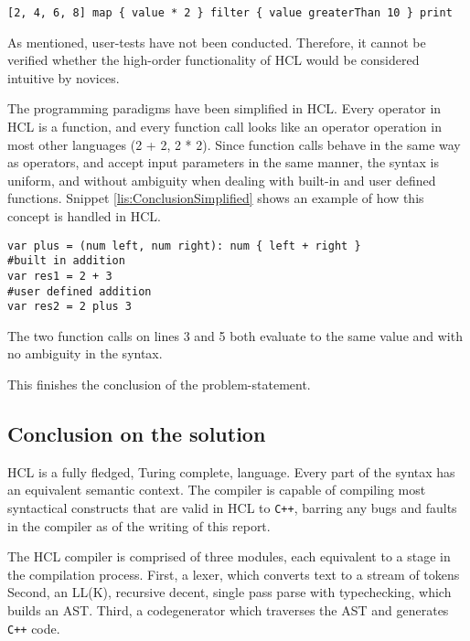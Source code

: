 \begin{lstlisting}[language=hcl,label=lis:ConclusionMapFilter,caption=High-order functionality in HCL]
[2, 4, 6, 8] map { value * 2 } filter { value greaterThan 10 } print
\end{lstlisting}

As mentioned, user-tests have not been conducted.
Therefore, it cannot be verified whether the high-order functionality of HCL would be considered intuitive by novices.

The programming paradigms have been simplified in HCL.
Every operator in HCL is a function, and every function call looks like an operator operation in most other languages (2 + 2, 2 * 2).
Since function calls behave in the same way as operators, and accept input parameters in the same manner, the syntax is uniform, and without ambiguity when dealing with built-in and user defined functions.
Snippet \ref{lis:ConclusionSimplified} shows an example of how this concept is handled in HCL.

\begin{lstlisting}[language=hcl,label=lis:ConclusionSimplified,caption=Built-in and user defined function]
var plus = (num left, num right): num { left + right }
#built in addition
var res1 = 2 + 3
#user defined addition
var res2 = 2 plus 3 
\end{lstlisting}

The two function calls on lines 3 and 5 both evaluate to the same value and with no ambiguity in the syntax.

This finishes the conclusion of the problem-statement.

\subsection{Conclusion on the solution} %
HCL is a fully fledged, Turing complete, language.
Every part of the syntax has an equivalent semantic context. 
The compiler is capable of compiling most syntactical constructs that are valid in HCL to \texttt{C++}, barring any bugs and faults in the compiler as of the writing of this report.

The HCL compiler is comprised of three modules, each equivalent to a stage in the compilation process.
First, a lexer, which converts text to a stream of tokens
Second, an LL(K), recursive decent, single pass parse with typechecking, which builds an AST.
Third, a codegenerator which traverses the AST and generates \texttt{C++} code.

